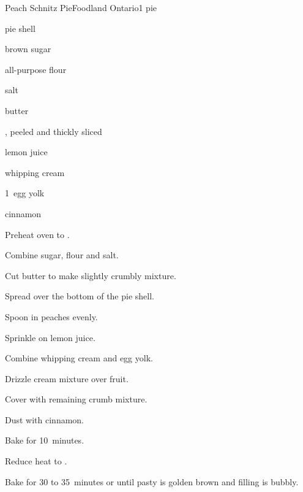 \begin{recipe}{Peach Schnitz Pie}{Foodland Ontario}{1 pie}

\begin{ingredients}
\item pie shell
\item \C{\twothird} brown sugar
\item {} all-purpose flour
\item salt
\item {} butter
\item {} , peeled and thickly sliced
\item {} lemon juice
\item \C{\quarter} whipping cream
\item 1~egg yolk
\item \C{\half} cinnamon
\end{ingredients}

\begin{directions}
\item Preheat oven to .
\item Combine sugar, flour and salt.
\item Cut butter to make slightly crumbly mixture.
\item Spread \third{} over the bottom of the pie shell.
\item Spoon in peaches evenly.
\item Sprinkle on lemon juice.
\item Combine whipping cream and egg yolk.
\item Drizzle cream mixture over fruit.
\item Cover with remaining crumb mixture.
\item Dust with cinnamon.
\item Bake for 10~minutes.
\item Reduce heat to .
\item Bake for 30 to 35~minutes or until pasty is golden brown and filling is bubbly.
\end{directions}

\end{recipe}
